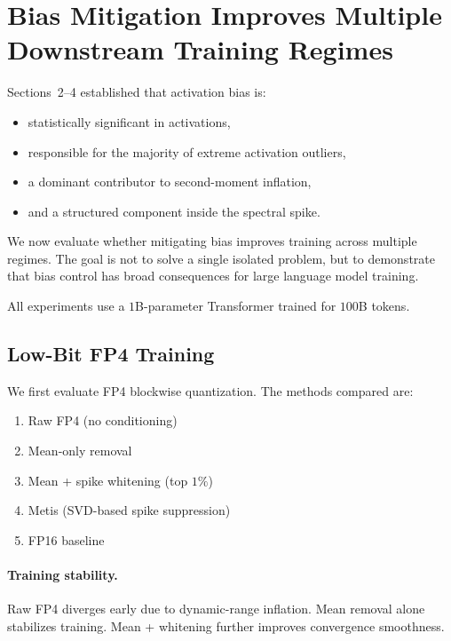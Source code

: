 \section{Bias Mitigation Improves Multiple Downstream Training Regimes}
\label{sec:downstream}

Sections~2--4 established that activation bias is:
\begin{itemize}
    \item statistically significant in activations,
    \item responsible for the majority of extreme activation outliers,
    \item a dominant contributor to second-moment inflation,
    \item and a structured component inside the spectral spike.
\end{itemize}

We now evaluate whether mitigating bias improves training across
multiple regimes.
The goal is not to solve a single isolated problem,
but to demonstrate that bias control has broad consequences
for large language model training.

All experiments use a $1$B-parameter Transformer trained for $100$B tokens.

\subsection{Low-Bit FP4 Training}

We first evaluate FP4 blockwise quantization.
The methods compared are:

\begin{enumerate}
    \item Raw FP4 (no conditioning)
    \item Mean-only removal
    \item Mean + spike whitening (top $1\%$)
    \item Metis (SVD-based spike suppression)
    \item FP16 baseline
\end{enumerate}

\paragraph{Training stability.}

Raw FP4 diverges early due to dynamic-range inflation.
Mean removal alone stabilizes training.
Mean + whitening further improves convergence smoothness.

